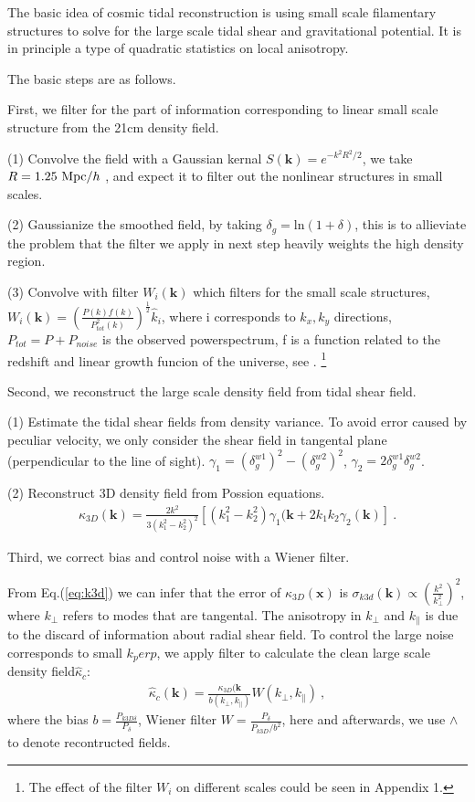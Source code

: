 The basic idea of cosmic tidal reconstruction is using small scale filamentary structures to solve for the large scale tidal shear and gravitational potential. 
It is in principle a type of quadratic statistics on local anisotropy.

The basic steps are as follows.

First, we filter for the part of information corresponding to linear small scale structure from the 21cm density field.

(1) Convolve the field with a Gaussian kernal
$S(\bm{k})=e^{-k^2R^2/2}$, 
we take $R=1.25\ \mathrm{Mpc}/h$ \cite{2012:pen}\cite{2015:zhu},
and expect it to filter out the nonlinear structures in small scales.

(2) Gaussianize the smoothed field, by taking 
$\delta_g=\mathrm{ln}(1+\delta)$, 
this is to allieviate the problem that the filter we apply in next step heavily weights the high density region.

(3) Convolve with filter $W_i(\bm{k})$ which filters for the small scale structures, 
$W_i(\bm{k})=(\frac{P(k)f(k)}{P_{tot}^2(k)})^{\frac{1}{2}}\hat{k}_i$,
where i corresponds to $k_x,k_y$ directions, $P_{tot}=P+P_{noise}$ is the observed powerspectrum, f is a function related to the redshift and linear growth funcion of the universe, see 
\cite{2015:zhu}.
\footnote{The effect of the filter $W_i$ on different scales could be seen in Appendix 1.}

Second, we reconstruct the large scale density field from tidal shear field.

(1) Estimate the tidal shear fields from density variance.
To avoid error caused by peculiar velocity, we only consider the shear field in tangental plane
(perpendicular to the line of sight).
$\gamma_1=(\delta_g^{w1})^2-(\delta_g^{w2})^2$,
$\gamma_2=2\delta_g^{w1}\delta_g^{w2}$.

(2) Reconstruct 3D density field from Possion equations.
\begin{eqnarray}
\label{eq:k3d}
\kappa_{3D}(\bm{k})=\frac{2k^2}{3(k_1^2-k_2^2)^2}[(k_1^2-k_2^2)\gamma_1(\bm{k}+2k_1k_2\gamma_2(\bm{k})]\ .
\end{eqnarray}

Third, we correct bias and control noise with a Wiener filter.

From Eq.(\ref{eq:k3d}) we can infer that the error of $\kappa_{3D}(\bm{x})$ is 
$\sigma_{k3d}(\bm{k})\propto(\frac{k^2}{k_\perp^2})^2$, where $k_\perp$ refers to modes that are tangental.
The anisotropy in $k_\perp$ and $k_\parallel$ is due to the discard of information about radial shear field.
To control the large noise corresponds to small $k_perp$, we apply filter to calculate the clean large scale density field$\hat \kappa_c$:
\begin{eqnarray}
	\label{eq:wiener}
\hat \kappa_{c}(\bm{k})=\frac{\kappa_{3D}(\bm{k}}{b(k_\perp,k_\parallel)}W(k_\perp,k_\parallel)\ ,
\end{eqnarray}
where the bias $b=\frac{P_{k3D \delta}}{P_\delta}$, Wiener filter $W=\frac{P_\delta}{P_{k3D}/b^2}$, here and afterwards, 
we use $\wedge$ to denote recontructed fields.

